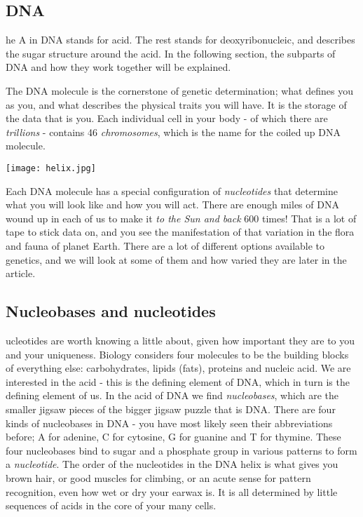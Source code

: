 \subsection{DNA}
he A in DNA stands for acid.
The rest stands for deoxyribonucleic, and describes the sugar structure around the acid.
In the following section, the subparts of DNA and how they work together will be explained.

The DNA molecule is the cornerstone of genetic determination; what defines you as you, and what describes the physical traits you will have.
It is the storage of the data that is you.
Each individual cell in your body - of which there are \emph{trillions} - contains 46 \emph{chromosomes}, which is the name for the coiled up DNA molecule.

\begin{center}
	\texttt{[image: helix.jpg]}
\end{center}

Each DNA molecule has a special configuration of \emph{nucleotides} that determine what you will look like and how you will act.
There are enough miles of DNA wound up in each of us to make it \emph{to the Sun and back} 600 times!
That is a lot of tape to stick data on, and you see the manifestation of that variation in the flora and fauna of planet Earth.
There are a lot of different options available to genetics, and we will look at some of them and how varied they are later in the article.

\subsection{Nucleobases and nucleotides}
ucleotides are worth knowing a little about, given how important they are to you and your uniqueness.
Biology considers four molecules to be the building blocks of everything else: carbohydrates, lipids (fats), proteins and nucleic acid.
We are interested in the acid - this is the defining element of DNA, which in turn is the defining element of us.
In the acid of DNA we find \emph{nucleobases}, which are the smaller jigsaw pieces of the bigger jigsaw puzzle that is DNA.
There are four kinds of nucleobases in DNA - you have most likely seen their abbreviations before; A for adenine, C for cytosine, G for guanine and T for thymine.
These four nucleobases bind to sugar and a phosphate group in various patterns to form a \emph{nucleotide}.
The order of the nucleotides in the DNA helix is what gives you brown hair, or good muscles for climbing, or an acute sense for pattern recognition, even how wet or dry your earwax is.
It is all determined by little sequences of acids in the core of your many cells.

